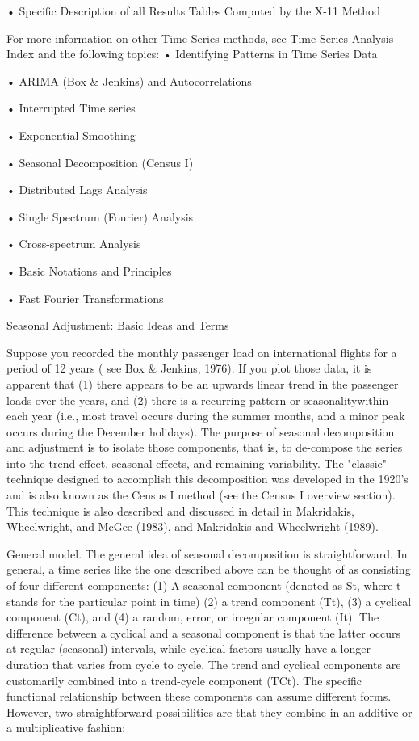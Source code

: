•
Specific Description of all Results Tables Computed by the X-11 Method


For more information on other Time Series methods, see Time Series Analysis - Index and the following topics:
•
Identifying Patterns in Time Series Data

•
ARIMA (Box & Jenkins) and Autocorrelations

•
Interrupted Time series

•
Exponential Smoothing

•
Seasonal Decomposition (Census I)

•
Distributed Lags Analysis

•
Single Spectrum (Fourier) Analysis

•
Cross-spectrum Analysis

•
Basic Notations and Principles

•
Fast Fourier Transformations



Seasonal Adjustment: Basic Ideas and Terms

Suppose you recorded the monthly passenger load on international flights for a period of 12 years ( see Box & Jenkins, 1976). If you plot those data, it is apparent that (1) there appears to be an upwards linear trend in the passenger loads over the years, and (2) there is a recurring pattern or seasonalitywithin each year (i.e., most travel occurs during the summer months, and a minor peak occurs during the December holidays). The purpose of seasonal decomposition and adjustment is to isolate those components, that is, to de-compose the series into the trend effect, seasonal effects, and remaining variability. The "classic" technique designed to accomplish this decomposition was developed in the 1920's and is also known as the Census I method (see the Census I overview section). This technique is also described and discussed in detail in Makridakis, Wheelwright, and McGee (1983), and Makridakis and Wheelwright (1989).

General model. The general idea of seasonal decomposition is straightforward. In general, a time series like the one described above can be thought of as consisting of four different components: (1) A seasonal component (denoted as St, where t stands for the particular point in time) (2) a trend component (Tt), (3) a cyclical component (Ct), and (4) a random, error, or irregular component (It). The difference between a cyclical and a seasonal component is that the latter occurs at regular (seasonal) intervals, while cyclical factors usually have a longer duration that varies from cycle to cycle. The trend and cyclical components are customarily combined into a trend-cycle component (TCt). The specific functional relationship between these components can assume different forms. However, two straightforward possibilities are that they combine in an additive or a multiplicative fashion:


